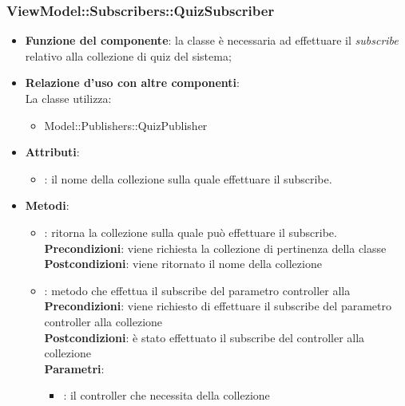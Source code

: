 \subsubsection{ViewModel::Subscribers::QuizSubscriber}
\begin{itemize}
\item\textbf{Funzione del componente}: la classe è necessaria ad effettuare il \emph{subscribe} relativo alla collezione di quiz del sistema;
	\item\textbf{Relazione d'uso con altre componenti}:\\
La classe utilizza:
	\begin{itemize}
		\item Model::Publishers::QuizPublisher
	\end{itemize}
\item\textbf{Attributi}:
	\begin{itemize}
		\item{}: il nome della collezione sulla quale effettuare il subscribe.\\	
	\end{itemize}
\item\textbf{Metodi}:
	\begin{itemize}
		\item{}: ritorna la collezione sulla quale può effettuare il subscribe.\\
		\textbf{Precondizioni}: viene richiesta la collezione di pertinenza della classe\\
		\textbf{Postcondizioni}: viene ritornato il nome della collezione\\
		\item{}: metodo che effettua il subscribe del parametro controller alla
		\textbf{Precondizioni}: viene richiesto di effettuare il subscribe del parametro controller alla collezione\\
		\textbf{Postcondizioni}: è stato effettuato il subscribe del controller alla collezione\\
		\textbf{Parametri}:
			\begin{itemize}
				\item{}: il controller che necessita della collezione\\
			\end{itemize}
	\end{itemize}
\end{itemize}


